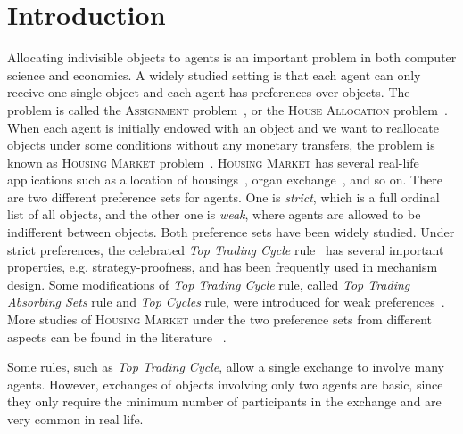 \section{Introduction}
Allocating indivisible objects to agents is an important problem in both computer science and economics.
A widely studied setting is that each agent can only receive one single object and each agent has preferences over objects.
The problem is called the \textsc{Assignment} problem~\citep{G1973Assignment,Wilson1977Assignment}, or the \textsc{House Allocation} problem~\citep{abdulkadirouglu1998random,Manlove2013Algorithmics}.
When each agent is initially endowed with an object and we want to reallocate objects under some conditions without any monetary transfers, the problem
is known as \textsc{Housing Market} problem~\citep{Shapley1974}.
\textsc{Housing Market} has several real-life applications such as allocation of housings~\citep{abdulkadirouglu1999house}, organ exchange~\citep{roth2004kidney}, and so on.
There are two different preference sets for agents. One is \emph{strict}, which is a full ordinal list of all objects, and the other one is
 \emph{weak}, where agents are allowed to be indifferent between objects. Both preference sets have been widely studied.
Under strict preferences, the celebrated \textit{Top Trading Cycle} rule~\citep{Shapley1974} has several important properties, e.g. strategy-proofness, and has been frequently used in mechanism design.
Some modifications of \textit{Top Trading Cycle} rule, called \textit{Top Trading Absorbing Sets} rule and \textit{Top Cycles} rule,
were introduced for weak preferences~\citep{alcalde2011exchange,jaramillo2012difference}.
More studies of \textsc{Housing Market} under the two preference sets from different aspects can be found in the literature ~\citep{jaramillo2012difference,aziz2012housing,saban2013house,ehlers2014top,sonoda2014two,ahmad2017essays}.


Some rules, such as \textit{Top Trading Cycle}, allow a single exchange to involve many agents.
However, exchanges of objects involving only two agents are basic, since they only require the minimum number of participants in the exchange and are very common in real life.


